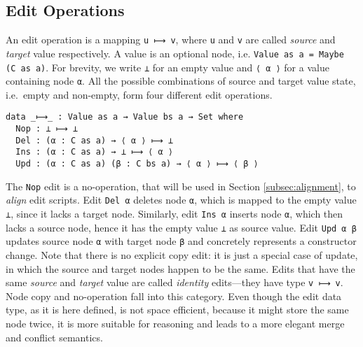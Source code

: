 \documentclass{sigplanconf}
\theoremstyle{plain}
\begin{document}
\subsection{Edit Operations}
An edit operation is a mapping \texttt{u ⟼ v}, where \texttt{u} and
\texttt{v} are called \emph{source} and \emph{target} value
respectively.
%
A value is an optional node, i.e.  \texttt{Value as a = Maybe (C as
  a)}. 
%
For brevity, we write \texttt{⊥} for an empty value and \texttt{⟨ α ⟩}
for a value containing node \texttt{α}.
% 
All the possible combinations of source and target value state, i.e.\
empty and non-empty, form four different edit operations.
\begin{verbatim}
data _⟼_ : Value as a → Value bs a → Set where
  Nop : ⊥ ⟼ ⊥
  Del : (α : C as a) → ⟨ α ⟩ ⟼ ⊥
  Ins : (α : C as a) → ⊥ ⟼ ⟨ α ⟩
  Upd : (α : C as a) (β : C bs a) → ⟨ α ⟩ ⟼ ⟨ β ⟩
\end{verbatim}
The \texttt{Nop} edit is a no-operation, that will be
used in Section \ref{subsec:alignment}, to \emph{align} edit scripts.
%
Edit \texttt{Del α} deletes node \texttt{α}, which is mapped to
the empty value \texttt{⊥}, since it lacks a target node.
%
Similarly, edit \texttt{Ins α} inserts node \texttt{α}, which
then lacks a source node, hence it has the empty value \texttt{⊥} 
as source value.
%
Edit \texttt{Upd α β} updates source node \texttt{α} with target node
\texttt{β} and concretely represents a constructor change.
%
Note that there is no explicit copy edit: it is just a special case of
update, in which the source and target nodes happen to be the same.
%
Edits that have the same \emph{source} and \emph{target} value are
called \emph{identity} edits---they have type \texttt{v
  ⟼ v}.
%
Node copy and no-operation fall into this category.
%
Even though the edit data type, as it is here defined, is not space
efficient, because it might store the same node twice, it is more
suitable for reasoning and leads to a more elegant merge and conflict
semantics.
%
	
\end{document}

